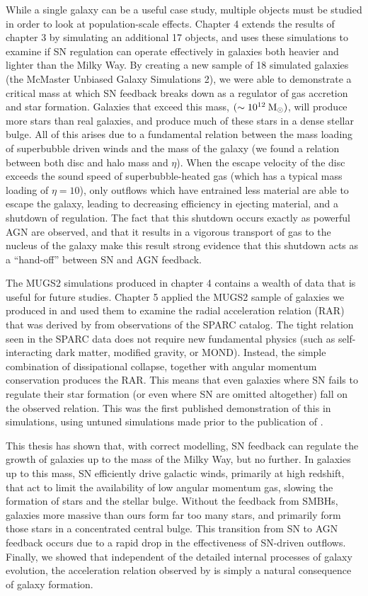 While a single galaxy can be a useful case study, multiple objects must be
studied in order to look at population-scale effects.  Chapter 4 extends the
results of chapter 3 by simulating an additional 17 objects, and uses these
simulations to examine if SN regulation can operate effectively in galaxies both
heavier and lighter than the Milky Way.  By creating a new sample of 18
simulated galaxies (the McMaster Unbiased Galaxy Simulations 2), we were able to
demonstrate a critical mass at which SN feedback breaks down as a regulator of
gas accretion and star formation.  Galaxies that exceed this mass, $(\sim
10^{12}\>{\rm M_{\odot}})$, will produce more stars than real galaxies, and produce much
of these stars in a dense stellar bulge.  All of this arises due to a
fundamental relation between the mass loading of superbubble driven winds and
the mass of the galaxy (we found a relation between both disc and halo mass and
$\eta$).  When the escape velocity of the disc exceeds the sound speed of
superbubble-heated gas (which has a typical mass loading of $\eta=10$), only
outflows which have entrained less material are able to escape the galaxy,
leading to decreasing efficiency in ejecting material, and a shutdown of 
regulation.  The fact that this shutdown occurs exactly as powerful AGN are
observed, and that it results in a vigorous transport of gas to the nucleus of
the galaxy make this result strong evidence that this shutdown acts as a 
``hand-off'' between SN and AGN feedback.

The MUGS2 simulations produced in chapter 4 contains a wealth of data that is
useful for future studies. Chapter 5 applied the MUGS2 sample of galaxies we
produced in \citet{Keller2016a} and used them to examine the radial acceleration
relation (RAR) that was derived by \citet{McGaugh2016} from observations of the
SPARC \citep{Lelli2016b} catalog.  The tight relation seen in the SPARC data
does not require new fundamental physics (such as self-interacting dark matter,
modified gravity, or MOND).  Instead, the simple combination of dissipational
collapse, together with angular momentum conservation produces the RAR. This
means that even galaxies where SN fails to regulate their star formation (or
even where SN are omitted altogether) fall on the observed relation.  This was
the first published demonstration of this in simulations, using untuned
simulations made prior to the publication of \citet{McGaugh2016}.

This thesis has shown that, with correct modelling, SN feedback can regulate the
growth of galaxies up to the mass of the Milky Way, but no further.  In galaxies
up to this mass, SN efficiently drive galactic winds, primarily at
high redshift, that act to limit the availability of low angular momentum gas,
slowing the formation of stars and the stellar bulge. Without the
feedback from SMBHs, galaxies more massive than ours form far too many stars,
and primarily form those stars in a concentrated central bulge.  This transition
from SN to AGN feedback occurs due to a rapid drop in the effectiveness of
SN-driven outflows.  Finally, we showed that independent of the detailed
internal processes of galaxy evolution, the acceleration relation observed by
\citet{McGaugh2016} is simply a natural consequence of galaxy formation.

